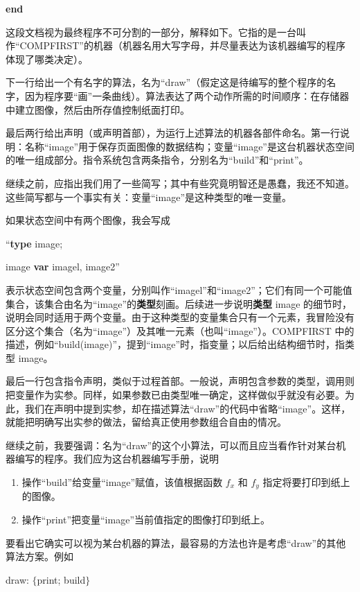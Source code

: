\documentclass[twoside,11pt,fontset=none]{ctexbook}
\begin{document}
\textbf{end}

这段文档视为最终程序不可分割的一部分，解释如下。它指的是一台叫作“COMPFIRST”的机器（机器名用大写字母，并尽量表达为该机器编写的程序体现了哪类决定）。

下一行给出一个有名字的算法，名为“draw”（假定这是待编写的整个程序的名字，因为程序要“画”一条曲线）。算法表达了两个动作所需的时间顺序：在存储器中建立图像，然后由所存值控制纸面打印。

最后两行给出声明（或声明首部），为运行上述算法的机器各部件命名。第一行说明：名称“image”用于保存页面图像的数据结构；变量“image”是这台机器状态空间的唯一组成部分。指令系统包含两条指令，分别名为“build”和“print”。

继续之前，应指出我们用了一些简写；其中有些究竟明智还是愚蠢，我还不知道。这些简写都与一个事实有关：变量“image”是这种类型的唯一变量。

如果状态空间中有两个图像，我会写成

\noindent
``\textbf{type} image;

\noindent
image \textbf{var} imagel, image2''

\noindent
表示状态空间包含两个变量，分别叫作“imagel”和“image2”；它们有同一个可能值集合，该集合由名为“image”的\textbf{类型}刻画。后续进一步说明\textbf{类型} image 的细节时，说明会同时适用于两个变量。由于这种类型的变量集合只有一个元素，我冒险没有区分这个集合（名为“image”）及其唯一元素（也叫“image”）。COMPFIRST 中的描述，例如“build(image)”，提到“image”时，指变量；以后给出结构细节时，指类型 image。

最后一行包含指令声明，类似于过程首部。一般说，声明包含参数的类型，调用则把变量作为实参。同样，如果参数已由类型唯一确定，这样做似乎就没有必要。为此，我们在声明中提到实参，却在描述算法“draw”的代码中省略“image”。这样，就能把明确写出实参的做法，留给真正使用参数组合自由的情况。

继续之前，我要强调：名为“draw”的这个小算法，可以而且应当看作针对某台机器编写的程序。我们应为这台机器编写手册，说明
\begin{enumerate}[wide, nosep, label=(\arabic*)]
	\item 操作“build”给变量“image”赋值，该值根据函数 $f_x$ 和 $f_y$ 指定将要打印到纸上的图像。

	\item 操作“print”把变量“image”当前值指定的图像打印到纸上。
\end{enumerate}

要看出它确实可以视为某台机器的算法，最容易的方法也许是考虑“draw”的其他算法方案。例如

draw: $\{$print; build$\}$
\end{document}
